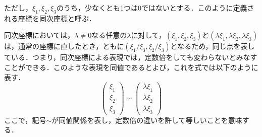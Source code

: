 \documentclass[openright]{nitocs}
\numberwithin{equation}{section}
\begin{document}
                ただし，$\xi_1,\xi_2,\xi_3$のうち，少なくとも1つは0ではないとする．このように定義される座標を同次座標と呼ぶ\cite{DIP}．

                同次座標においては，$\lambda\neq0$なる任意の$\lambda$に対して，$(\xi_1,\xi_2,\xi_3)$と$(\lambda\xi_1,\lambda\xi_2,\lambda\xi_3)$は，通常の座標に直したとき，ともに$(\xi_1/\xi_3,\xi_2/\xi_3)$となるため，同じ点を表している．つまり，同次座標による表現では，定数倍をしても変わらないとみなすことができる．このような表現を同値であるとよび，これを式では以下のように表す．
                \begin{equation} %
                    \left(
                        \begin{array}{ccc}
                            \xi_1\\
                            \xi_2\\
                            \xi_3
                        \end{array}
                    \right) \sim %
                    \left(
                        \begin{array}{ccc}
                            \lambda\xi_1\\
                            \lambda\xi_2\\
                            \lambda\xi_3
                        \end{array}
                    \right)
                \end{equation}
                ここで，記号$\sim$が同値関係を表し，定数倍の違いを許して等しいことを意味する．
\end{document}
